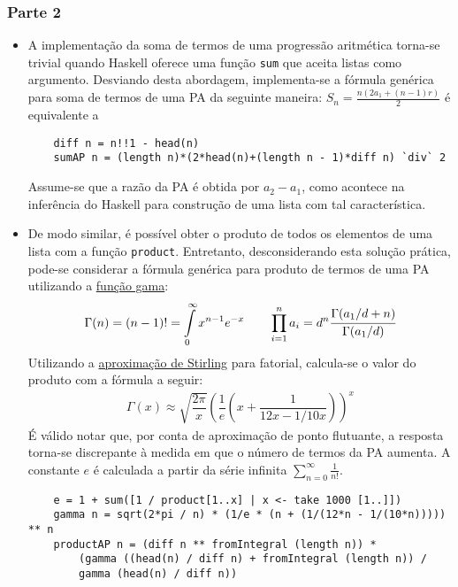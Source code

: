 \documentclass{article}
\begin{document}
\subsubsection*{Parte 2}
\begin{itemize}
    \item A implementação da soma de termos de uma progressão aritmética
    torna-se trivial quando Haskell oferece uma função \texttt{sum} que aceita
    listas como argumento. Desviando desta abordagem, implementa-se a fórmula
    genérica para soma de termos de uma PA da seguinte maneira:
    $S_n = \frac{n(2a_1 + (n - 1)r)}{2}$ é equivalente a
    \begin{verbatim}
    diff n = n!!1 - head(n)
    sumAP n = (length n)*(2*head(n)+(length n - 1)*diff n) `div` 2\end{verbatim}
    Assume-se que a razão da PA é obtida por $a_2 - a_1$, como acontece na
    inferência do Haskell para construção de uma lista com tal característica.

    \item De modo similar, é possível obter o produto de todos os elementos de
    uma lista com a função \texttt{product}. Entretanto, desconsiderando esta
    solução prática, pode-se considerar a fórmula genérica para produto de
    termos de uma PA utilizando a
    \href{http://mathworld.wolfram.com/GammaFunction.html}{função gama}:
    \begin{gather*}
    \Gamma(n) = (n-1)! = \int\limits_0^\infty x^{n-1}e^{-x} \qquad
    \prod\limits_{i=1}^n a_{i} = d^n \cfrac{\Gamma(a_1/d + n)}{\Gamma(a_1/d)}
    \end{gather*}
    Utilizando a \href{https://en.wikipedia.org/wiki/Stirling%27s_approximation}
    {aproximação de Stirling} para fatorial, calcula-se o valor do produto com
    a fórmula a seguir:
    \begin{gather*}
    \Gamma(x) \approx \sqrt{\dfrac{2\pi}{x}}\left(\dfrac{1}{e}\left(x +
    \dfrac{1}{12x - 1/10x}\right)\right)^x
    \end{gather*}
    É válido notar que, por conta de aproximação de ponto flutuante, a resposta
    torna-se discrepante à medida em que o número de termos da PA aumenta. A
    constante $e$ é calculada a partir da série infinita
    $\sum\limits_{n=0}^{\infty} \frac{1}{n!}$.
    \begin{verbatim}
    e = 1 + sum([1 / product[1..x] | x <- take 1000 [1..]])
    gamma n = sqrt(2*pi / n) * (1/e * (n + (1/(12*n - 1/(10*n))))) ** n
    productAP n = (diff n ** fromIntegral (length n)) *
        (gamma ((head(n) / diff n) + fromIntegral (length n)) /
        gamma (head(n) / diff n))
     \end{verbatim}
\end{itemize}
\end{document}
